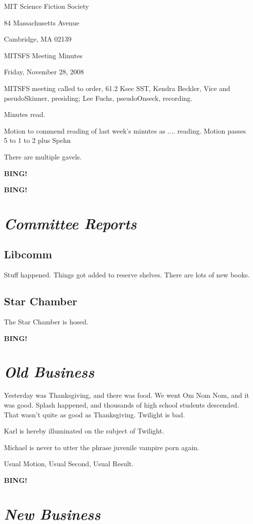 \documentclass[10pt]{article}
\newcommand{\bing}{{\bf BING!} }
\newcommand{\goto}[1]{\bing \vskip 12pt \section*{{\em{#1}}}}
\begin{document}
\begin{center}

MIT Science Fiction Society

84 Massachusetts Avenue

Cambridge, MA 02139

\vspace{12pt}

MITSFS Meeting Minutes

Friday, November 28, 2008

\end{center}

\vspace{18pt}

\setlength{\parskip}{6pt}

\noindent
MITSFS meeting called to order, 61.2 Ksec SST,
Kendra Beckler, Vice and pseudoSkinner, presiding; Lee Fuchs, pseudoOnseck, recording.

Minutes read.

Motion to commend reading of last week's minutes as .... reading.
Motion passes 5 to 1 to 2 plus Spehn

There are multiple gavels.

\bing

\goto{Committee Reports}

\subsection*{Libcomm}

Stuff happened.  Things got added to reserve shelves. There are lots of new books.

\subsection*{Star Chamber}

The Star Chamber is hosed.

\goto{Old Business}

Yesterday was Thanksgiving, and there was food. We went Om Nom Nom, and it was good.  Splash happened, and thousands of high school students descended. That wasn't quite as good as Thanksgiving. Twilight is bad.

Karl is hereby illuminated on the subject of Twilight.

Michael is never to utter the phrase juvenile vampire porn again.

Usual Motion, Usual Second, Usual Result.

\goto{New Business}
\end{document}
